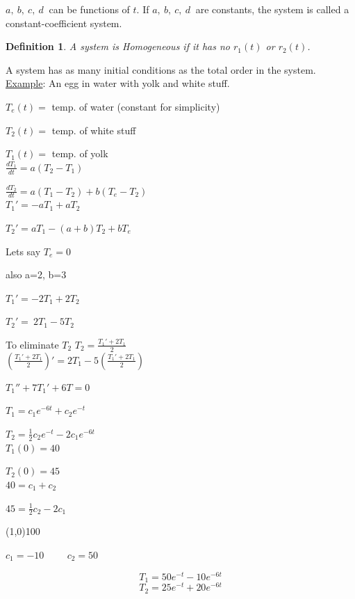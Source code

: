 \documentclass[12pt]{article}
\newtheorem{definition}{Definition}[section]
\numberwithin{equation}{subsection}
\newcommand{\dert}[1]{\frac{d #1}{dt}}
\newcommand{\indb}{\hspace{1cm}}
\newcommand{\indc}{\hspace{1.5cm}}
\newcommand{\indd}{\hspace{2cm}}
\newcommand{\inde}{\hspace{2.5cm}}
\newcommand{\indf}{\hspace{3cm}}
\newcommand{\indh}{\hspace{4cm}}
\newcommand{\indi}{\hspace{4.5cm}}
\newcommand{\indj}{\hspace{5cm}}
\newcommand{\exa}{\noindent \underline{Example}: \hspace{1cm}}
\begin{document}
$a,\ b,\ c,\ d\ $ can be functions of $t$. If $a,\ b,\ c,\ d\ $ are constants, the system is called a constant-coefficient system.\\

\begin{definition}
A system is Homogeneous if it has no $r_1(t)$ or $r_2(t)$.
\end{definition}

A system has as many initial conditions as the total order in the system. \\


\exa An egg in water with yolk and white stuff.

\indd $T_e(t)=$ temp. of water (constant for simplicity)

\indd $T_2(t)=$ temp. of white stuff 

\indd $T_1(t)=$ temp. of yolk\\

\indj $\displaystyle \dert{T_1}=a(T_2-T_1)  $

\indh $\displaystyle \dert{T_2}=a(T_1-T_2) + b(T_e-T_2) $\\

\indj $T_1'=-aT_1+aT_2  $

\indj $ T_2'=aT_1-(a+b)T_2+bT_e$

Lets say $T_e=0$

also a=2, b=3

\indj $T_1'=-2T_1+2T_2  $

\indj $ T_2'=\ 2T_1-5T_2$

\indj To eliminate $T_2$ \inde $\displaystyle T_2=\frac{T_1'+2T_1}{2}$\\

\indi $\displaystyle \left( \frac{T_1'+2T_1}{2} \right)'=2T_1-5\left( \frac{T_1'+2T_1}{2} \right)$

\indj $T_1''+7T_1'+6T=0$


\indf $T_1 = c_1e^{-6t}+c_2e^{-t}$

\indf $T_2 = \frac{1}{2}c_2e^{-t}-2c_1e^{-6t}$\\

\indd $T_1(0)=40$

\indd $T_2(0)=45$\\

\indd $40=c_1+c_2$

\indd $45=\frac{1}{2}c_2-2c_1$

\indc \line(1,0){100}

\indd $c_1=-10 \indb c_2=50$

$$T_1 = 50e^{-t}-10e^{-6t} $$
$$T_2 = 25e^{-t}+20e^{-6t} $$
\end{document}
